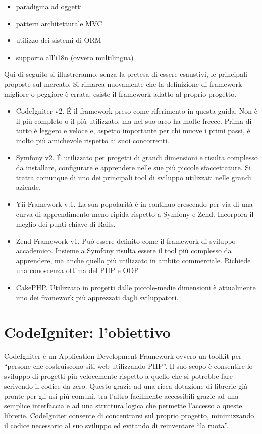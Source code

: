 \begin{itemize}
\item paradigma ad oggetti
\item pattern architetturale \ac{MVC}
\item utilizzo dei sistemi di \ac{ORM}
\item supporto all'i18n (ovvero multilingua)
\end{itemize}

Qui di seguito si illustreranno, senza la pretesa di essere esaustivi, le principali proposte sul mercato. Si rimarca nuovamente che la definizione di framework migliore o peggiore  è errata: esiste il framework adatto al proprio progetto.

\begin{itemize}
\item CodeIgniter v2. \'E il framework preso come riferimento in questa guida. Non è il più completo o il più utilizzato, ma nel suo arco ha molte frecce. Prima di tutto è leggero e veloce e, aspetto importante per chi muove i primi passi, è molto più amichevole rispetto ai suoi concorrenti. 
\item Symfony v2. \'E utilizzato per progetti di grandi dimensioni e risulta complesso da installare, configurare e apprendere nelle sue più piccole sfaccettature. Si tratta comunque di uno dei principali tool di sviluppo utilizzati nelle grandi aziende.
\item Yii Framework v.1. La sua popolarità è in continuo crescendo per via di una curva di apprendimento meno ripida rispetto a Symfony e Zend. Incorpora il meglio dei punti chiave di Rails.
\item Zend Framework v1. Può essere definito come il framework di sviluppo accademico. Insieme a Symfony risulta essere il tool più complesso da apprendere, ma anche quello più utilizzato in ambito commerciale. Richiede una conoscenza ottima del \ac{PHP} e \ac{OOP}. 
\item CakePHP. Utilizzato in progetti dalle piccole-medie dimensioni è attualmente uno dei framework più apprezzati dagli sviluppatori.
\end{itemize}

\section*{CodeIgniter: l'obiettivo}
CodeIgniter è un Application Development Framework ovvero un toolkit per ``persone che costruiscono siti web utilizzando \ac{PHP}''. Il suo scopo è consentire lo sviluppo di progetti più velocemente rispetto a quello che si potrebbe fare scrivendo il codice da zero. Questo grazie ad una ricca dotazione di librerie già pronte per gli usi più comuni, tra l'altro facilmente accessibili grazie ad una semplice interfaccia e ad una struttura logica che permette l'accesso a queste librerie. CodeIgniter consente di concentrarsi sul proprio progetto, minimizzando il codice necessario al suo sviluppo ed evitando di reinventare ``la ruota''.

